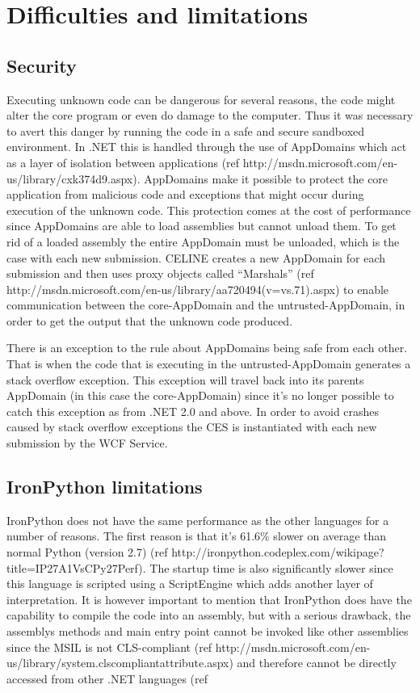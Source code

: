 \section{Difficulties and limitations}

\subsection{Security}
Executing unknown code can be dangerous for several reasons, the code might alter the core program or even do damage to the computer. Thus it was necessary to avert this danger by running the code in a safe and secure sandboxed environment. In .NET this is handled through the use of AppDomains which act as a layer of isolation between applications (ref http://msdn.microsoft.com/en-us/library/cxk374d9.aspx). AppDomains make it possible to protect the core application from malicious code and exceptions that might occur during execution of the unknown code. This protection comes at the cost of performance since AppDomains are able to load assemblies but cannot unload them. To get rid of a loaded assembly the entire AppDomain must be unloaded, which is the case with each new submission. CELINE creates a new AppDomain for each submission and then uses proxy objects called ``Marshals'' (ref http://msdn.microsoft.com/en-us/library/aa720494(v=vs.71).aspx) to enable communication between the core-AppDomain and the untrusted-AppDomain, in order to get the output that the unknown code produced.

There is an exception to the rule about AppDomains being safe from each other. That is when the code that is executing in the untrusted-AppDomain generates a stack overflow exception. This exception will travel back into its parents AppDomain (in this case the core-AppDomain) since it's no longer possible to catch this exception as from .NET 2.0 and above. In order to avoid crashes caused by stack overflow exceptions the CES is instantiated with each new submission by the WCF Service.


\subsection{IronPython limitations} \label{subsec:ironpython_limitations}
IronPython does not have the same performance as the other languages for a number of reasons. The first reason is that it's 61.6\% slower on average than normal Python (version 2.7) (ref http://ironpython.codeplex.com/wikipage?title=IP27A1VsCPy27Perf). The startup time is also significantly slower since this language is scripted using a ScriptEngine which adds another layer of interpretation. It is however important to mention that IronPython does have the capability to compile the code into an assembly, but with a serious drawback, the assemblys methods and main entry point cannot be invoked like other assemblies since the MSIL is not CLS-compliant (ref http://msdn.microsoft.com/en-us/library/system.clscompliantattribute.aspx) and therefore cannot be directly accessed from other .NET languages (ref %


